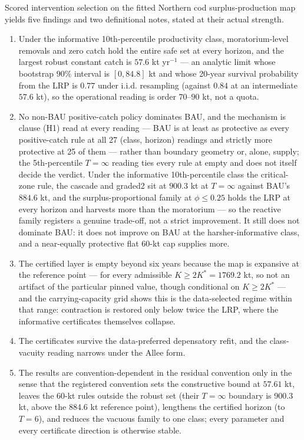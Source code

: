\documentclass[11pt]{article}
\begin{document}
Scored intervention selection on the fitted Northern cod
surplus-production map yields five findings and two definitional notes,
stated at their actual strength.

\begin{enumerate}
\def\labelenumi{(\arabic{enumi})}
\item
  Under the informative 10th-percentile productivity class,
  moratorium-level removals and zero catch hold the entire safe set at
  every horizon, and the largest robust constant catch is \(57.6\) kt
  yr\(^{-1}\) --- an analytic limit whose bootstrap \(90\%\) interval is
  \([0, 84.8]\) kt and whose 20-year survival probability from the LRP
  is \(0.77\) under i.i.d. resampling (against \(0.84\) at an
  intermediate \(57.6\) kt), so the operational reading is order
  \(70\)--\(90\) kt, not a quota.
\item
  No non-BAU positive-catch policy dominates BAU, and the mechanism is
  clause (H1) read at every reading --- BAU is at least as protective as
  every positive-catch rule at all 27 (class, horizon) readings and
  strictly more protective at 25 of them --- rather than boundary
  geometry or, alone, supply; the 5th-percentile \(T=\infty\) reading
  ties every rule at empty and does not itself decide the verdict.
  Under the informative 10th-percentile class the critical-zone rule,
  the cascade and graded2 sit at \(900.3\) kt at \(T = \infty\) against
  BAU's \(884.6\) kt, and the surplus-proportional family at
  \(\phi \le 0.25\) holds the LRP at every horizon and harvests more
  than the moratorium --- so the reactive family registers a genuine
  trade-off, not a strict improvement. It still does not dominate BAU:
  it does not improve on BAU at the harsher-informative class, and a
  near-equally protective flat 60-kt cap supplies more.
\item
  The certified layer is empty beyond six years because the map is
  expansive at the reference point --- for every admissible
  \(K \ge 2K^* = 1769.2\) kt, so not an artifact of the particular
  pinned value, though conditional on \(K \ge 2K^*\) --- and the
  carrying-capacity grid shows this is the data-selected regime within
  that range: contraction is restored only below twice the LRP, where
  the informative certificates themselves collapse.
\item
  The certificates survive the data-preferred depensatory refit, and the
  class-vacuity reading narrows under the Allee form.
\item
  The results are convention-dependent in the residual convention only
  in the sense that the registered convention sets the constructive
  bound at \(57.61\) kt, leaves the 60-kt rules outside the robust set
  (their \(T=\infty\) boundary is 900.3 kt, above the 884.6 kt reference
  point), lengthens the certified horizon (to \(T=6\)), and reduces
  the vacuous family to one class; every parameter and every certificate
  direction is otherwise stable.
\end{enumerate}
\end{document}
